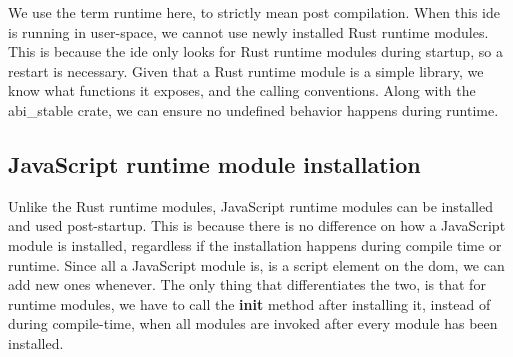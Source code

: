 We use the term runtime here, to strictly mean post compilation. When this
\gls*{ide} is running in user-space, we cannot use newly installed Rust
runtime modules. This is because the \gls*{ide} only looks for Rust runtime
modules during startup, so a restart is necessary. Given that a Rust runtime
module is a simple library, we know what functions it exposes, and the calling
conventions. Along with the abi\_stable crate, we can ensure no undefined
behavior happens during runtime.


\subsection{JavaScript runtime module installation}

Unlike the Rust runtime modules, JavaScript runtime modules can be installed and
used post-startup. This is because there is no difference on how a JavaScript
module is installed, regardless if the installation happens during compile time
or runtime. Since all a JavaScript module is, is a script element on the
\gls*{dom}, we can add new ones whenever. The only thing that differentiates the
two, is that for runtime modules, we have to call the \textbf{init} method after
installing it, instead of during compile-time, when all modules are invoked
after every module has been installed.


